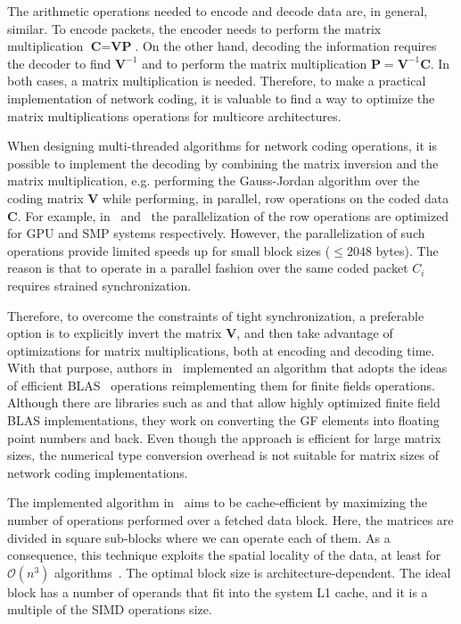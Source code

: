 The arithmetic operations needed to encode and decode data are,
in general, similar. To encode packets, the encoder needs to perform the
matrix multiplication $\textbf{C} = \textbf{V} \textbf{P}$. On the other
hand, decoding the information requires the decoder to find
$\textbf{V}^{-1}$ and to perform the matrix multiplication
$\textbf{P} = \textbf{V}^{-1} \textbf{C}$. In both cases, a matrix
multiplication is needed. Therefore, to make a practical implementation of
network coding, it is valuable to find a way to optimize the matrix
multiplications operations for multicore architectures.

When designing multi-threaded algorithms for network coding operations, it is
possible to implement the decoding by combining the matrix inversion and the
matrix multiplication, e.g. performing the Gauss-Jordan algorithm over the
coding matrix $\textbf{V}$ while performing, in parallel, row operations on the
coded data $\textbf{C}$. For example, in~\cite{5061951} and~\cite{4262451} the
parallelization of the row operations are optimized for \ac{GPU} and \ac{SMP}
systems respectively. However, the parallelization of such operations provide
limited speeds up for small block sizes ($\leq 2048$ bytes). The reason is that
to operate in a parallel fashion over the same coded packet $C_i$ requires
strained synchronization.

Therefore, to overcome the constraints of tight synchronization, a
preferable option is to explicitly invert the matrix $\textbf{V}$, and then
take advantage of optimizations for matrix multiplications, both at
encoding and decoding time. With that purpose, authors
in~\cite{wunderlich2015network} implemented an algorithm that adopts
the ideas of efficient \ac{BLAS}~\cite{lawson1979basic} operations
reimplementing them for finite fields operations. Although there are
libraries such as \cite{dumas2008dense} and \cite{dumas2002linbox} that allow
highly optimized finite field \ac{BLAS} implementations, they work on
converting the \ac{GF} elements into floating point numbers and back.
Even though the approach is efficient for large matrix sizes, the
numerical type conversion overhead is not suitable for matrix sizes of
network coding implementations.

The implemented algorithm in~\cite{wunderlich2015network} aims to be
cache-efficient by maximizing the number of operations performed over a
fetched data block. Here, the matrices are divided in square sub-blocks
where we can operate each of them. As a consequence, this technique
exploits the spatial locality of the data, at least for
$\mathcal{O}(n^3)$ algorithms~\cite{golub2012matrix}. The optimal block
size is architecture-dependent. The ideal block has a number of operands
that fit into the system L1 cache, and it is a multiple of the \ac{SIMD}
operations size.

